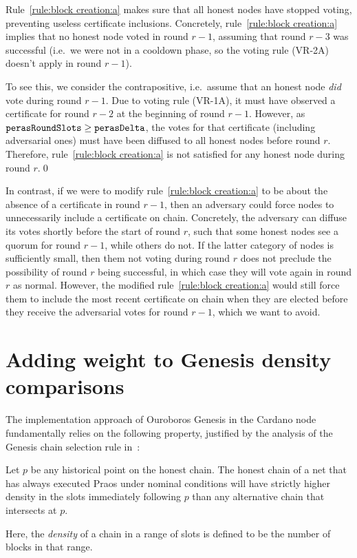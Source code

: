 Rule~\ref{rule:block creation:a} makes sure that all honest nodes have stopped voting, preventing useless certificate inclusions.
Concretely, rule~\ref{rule:block creation:a} implies that no honest node voted in round $r-1$, assuming that round $r-3$ was successful (i.e.\ we were not in a cooldown phase, so the voting rule (VR-2A) doesn't apply in round $r-1$).

To see this, we consider the contrapositive, i.e.\ assume that an honest node \emph{did} vote during round $r-1$.
Due to voting rule (VR-1A), it must have observed a certificate for round $r-2$ at the beginning of round $r-1$.
However, as $\mathtt{perasRoundSlots}\ge\mathtt{perasDelta}$, the votes for that certificate (including adversarial ones) must have been diffused to all honest nodes before round $r$.
Therefore, rule~\ref{rule:block creation:a} is not satisfied for any honest node during round $r$.\qed{}

In contrast, if we were to modify rule~\ref{rule:block creation:a} to be about the absence of a certificate in round $r-1$, then an adversary could force nodes to unnecessarily include a certificate on chain.
Concretely, the adversary can diffuse its votes shortly before the start of round $r$, such that some honest nodes see a quorum for round $r-1$, while others do not.
If the latter category of nodes is sufficiently small, then them not voting during round $r$ does not preclude the possibility of round $r$ being successful, in which case they will vote again in round $r$ as normal.
However, the modified rule~\ref{rule:block creation:a} would still force them to include the most recent certificate on chain when they are elected before they receive the adversarial votes for round $r-1$, which we want to avoid.

\section{Adding weight to Genesis density comparisons}

The implementation approach of Ouroboros Genesis in the Cardano node fundamentally relies on the following property, justified by the analysis of the Genesis chain selection rule in~\cite{badertscher2018ouroboros}:
\begin{tcolorbox}[title=\densityOfCompetingChainsName]\label{property:density-of-competing-chains}
  Let $p$ be any historical point on the honest chain. The honest chain of a net that has always executed Praos under nominal conditions will have strictly higher density in the \sgen{} slots immediately following $p$ than any alternative chain that intersects at $p$.
\end{tcolorbox}
Here, the \emph{density} of a chain in a range of slots is defined to be the number of blocks in that range.

